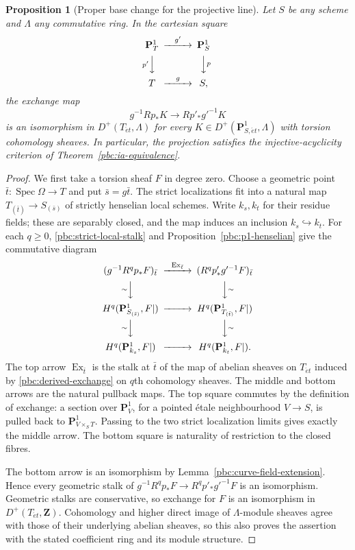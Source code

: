 \documentclass[11pt,a4paper]{article}
\numberwithin{equation}{section}
\newtheorem{proposition}[theorem]{Proposition}
\theoremstyle{definition}
\theoremstyle{remark}
\newcommand{\et}{\acute{e}t}
\newcommand{\Z}{\mathbf Z}
\newcommand{\PP}{\mathbf P}
\begin{document}
\begin{proposition}[Proper base change for the projective line]
\label{pbc:p1}
Let $S$ be any scheme and $\Lambda$ any commutative ring.  In the
cartesian square
\[
 \begin{CD}
 \PP^1_T @>{g'}>> \PP^1_S\\
 @V{p'}VV @VV{p}V\\
 T @>{g}>> S,
 \end{CD}
\]
the exchange map
\[
 g^{-1}Rp_*K\longrightarrow Rp'_*g'^{-1}K
\]
is an isomorphism in $D^+(T_{\et},\Lambda)$ for every
$K\in D^+(\PP^1_{S,\et},\Lambda)$ with torsion cohomology sheaves.  In particular, the projection satisfies
the injective-acyclicity criterion of Theorem~\ref{pbc:ia-equivalence}.
\end{proposition}
\begin{proof}
We first take a torsion sheaf $F$ in degree zero.  Choose a geometric
point $\bar t:\operatorname{Spec}\Omega\to T$ and put
$\bar s=g\bar t$.  The strict localizations fit into a natural map
$T_{(\bar t)}\to S_{(\bar s)}$ of strictly henselian local schemes.
Write $k_s,k_t$ for their residue fields; these are separably closed,
and the map induces an inclusion $k_s\hookrightarrow k_t$.
For each $q\geq0$, \eqref{pbc:strict-local-stalk} and
Proposition~\ref{pbc:p1-henselian} give the commutative diagram
\[
 \begin{CD}
 (g^{-1}R^qp_*F)_{\bar t}
 @>{\operatorname{Ex}_{\bar t}}>>
 (R^qp'_*g'^{-1}F)_{\bar t}\\
 @V{\sim}VV @VV{\sim}V\\
 H^q(\PP^1_{S_{(\bar s)}},F|)
 @>>> H^q(\PP^1_{T_{(\bar t)}},F|)\\
 @V{\sim}VV @VV{\sim}V\\
 H^q(\PP^1_{k_s},F|)
 @>>> H^q(\PP^1_{k_t},F|).
 \end{CD}
\]
The top arrow $\operatorname{Ex}_{\bar t}$ is the stalk at $\bar t$ of
the map of abelian sheaves on $T_{\et}$ induced by
\eqref{pbc:derived-exchange} on $q$th cohomology sheaves. The middle and
bottom arrows are the natural pullback maps.  The
top square commutes by the definition of exchange: a section over
$\PP^1_V$, for a pointed \'etale neighbourhood $V\to S$, is pulled
back to $\PP^1_{V\times_ST}$.  Passing to the two strict localization
limits gives exactly the middle arrow.  The bottom square is naturality
of restriction to the closed fibres.

The bottom arrow is an isomorphism by
Lemma~\ref{pbc:curve-field-extension}.  Hence every geometric stalk
of $g^{-1}R^qp_*F\to R^qp'_*g'^{-1}F$ is an isomorphism.
Geometric stalks are conservative, so exchange for $F$ is an
isomorphism in $D^+(T_{\et},\Z)$.  Cohomology and higher direct image of
$\Lambda$-module sheaves agree with those of their underlying abelian
sheaves, so this also proves the assertion with the stated coefficient
ring and its module structure.


\end{proof}
\end{document}
